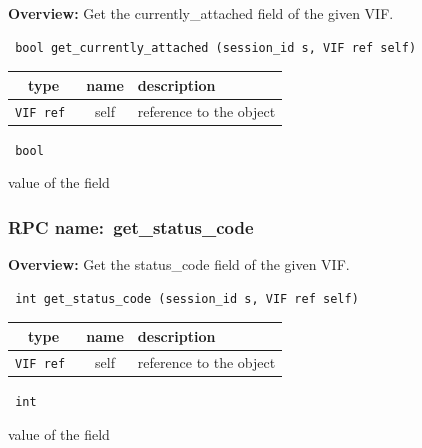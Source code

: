 {\bf Overview:} 
Get the currently\_attached field of the given VIF.

\begin{verbatim} bool get_currently_attached (session_id s, VIF ref self)\end{verbatim}



 
\vspace{0.3cm}
\begin{tabular}{|c|c|p{7cm}|}
 \hline
{\bf type} & {\bf name} & {\bf description} \\ \hline
{\tt VIF ref } & self & reference to the object \\ \hline 

\end{tabular}

\vspace{0.3cm}

{\tt 
bool
}


value of the field
\vspace{0.3cm}
\vspace{0.3cm}
\vspace{0.3cm}
\subsubsection{RPC name:~get\_status\_code}

{\bf Overview:} 
Get the status\_code field of the given VIF.

\begin{verbatim} int get_status_code (session_id s, VIF ref self)\end{verbatim}



 
\vspace{0.3cm}
\begin{tabular}{|c|c|p{7cm}|}
 \hline
{\bf type} & {\bf name} & {\bf description} \\ \hline
{\tt VIF ref } & self & reference to the object \\ \hline 

\end{tabular}

\vspace{0.3cm}

{\tt 
int
}


value of the field
\vspace{0.3cm}
\vspace{0.3cm}
\vspace{0.3cm}
